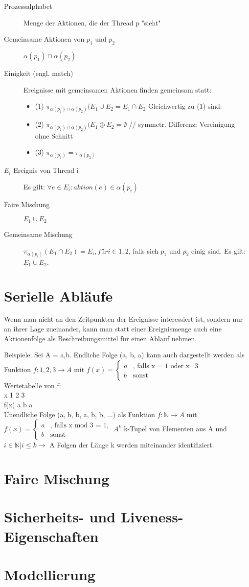 \begin{description}
	\item[Prozessalphabet] Menge der Aktionen, die der Thread p "sieht"
	\item[Gemeinsame Aktionen von $p_1$ und $p_2$] $\alpha(p_1) \cap \alpha(p_2)$
	\item[Einigkeit (engl. match)] Ereignisse mit gemeinsamen Aktionen finden gemeinsam statt:
		\begin{itemize}
			\item (1) $\pi_{\alpha(p_1) \cap \alpha(p_2)}(E_1 \cup E_2 = E_1 \cap E_2$ Gleichwertig zu (1) sind:\\
			\item (2) $\pi_{\alpha(p_1) \cap \alpha(p_2)}(E_1 \oplus E_2 = \emptyset$ // symmetr. Differenz: Vereinigung ohne Schnitt
			\item (3) $\pi_{\alpha(p_1)} = \pi_{\alpha(p_2)}$
		\end{itemize}
	\item[$E_i$ Ereignis von Thread i] Es gilt: $\forall e \in E_i: aktion(e) \in \alpha(p_i)$
	\item[Faire Mischung]$E_1 \cup E_2$
	\item[Gemeinsame Mischung] $\pi_{\alpha(p_i)}(E_1 \cap E_2) = E_i, für i \in {1,2}$, falls sich $p_1$ und $p_2$ einig sind. Es gilt: $E_1 \cup E_2$.
\end{description}


\section{Serielle Abläufe}
Wenn man nicht an den Zeitpunkten der Ereignisse interessiert ist, sondern nur an ihrer Lage zueinander, kann man statt einer Ereignismenge auch eine Aktionenfolge als Beschreibungsmittel für einen Ablauf nehmen.

Beispiele: Sei A = {a,b}. Endliche Folge (a, b, a) kann auch dargestellt werden als Funktion $f: {1,2,3} \rightarrow A$ mit $f(x) = \begin{cases} a &\text{, falls x = 1 oder x=3}\\ b &\text{sonst}\end{cases}$\\
Wertetabelle von f:\\
x     1   2   3\\
f(x)  a   b   a\\

Unendliche Folge (a, b, b, a, b, b, ...) als Funktion $f: \mathbb{N} \rightarrow A$ mit $f(x) = \begin{cases} a &\text{, falls x mod 3 = 1,} \\b &\text{sonst}\end{cases}$
$A^k$ k-Tupel von Elementen aus A und \\
${i \in \mathbb{N} | i \leq k} \rightarrow$ A Folgen der Länge k werden miteinander identifiziert.

\section{Faire Mischung}

\section{Sicherheits- und Liveness-Eigenschaften}

\section{Modellierung}